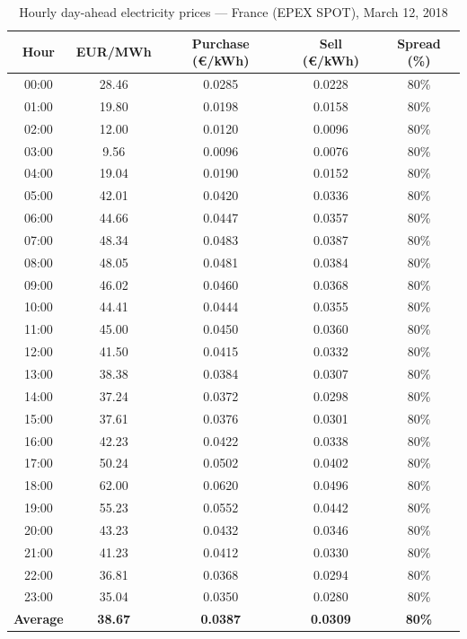 \begin{table}[H]
\centering
\caption{Hourly day-ahead electricity prices --- France (EPEX SPOT), March 12, 2018}
\label{tab:app_prices}
\begin{tabular}{@{}ccccc@{}}
\toprule
\textbf{Hour} & \textbf{EUR/MWh} & \textbf{Purchase (€/kWh)} & \textbf{Sell (€/kWh)} & \textbf{Spread (\%)} \\
\midrule
00:00 & 28.46 & 0.0285 & 0.0228 & 80\% \\
01:00 & 19.80 & 0.0198 & 0.0158 & 80\% \\
02:00 & 12.00 & 0.0120 & 0.0096 & 80\% \\
03:00 &  9.56 & 0.0096 & 0.0076 & 80\% \\
04:00 & 19.04 & 0.0190 & 0.0152 & 80\% \\
05:00 & 42.01 & 0.0420 & 0.0336 & 80\% \\
06:00 & 44.66 & 0.0447 & 0.0357 & 80\% \\
07:00 & 48.34 & 0.0483 & 0.0387 & 80\% \\
08:00 & 48.05 & 0.0481 & 0.0384 & 80\% \\
09:00 & 46.02 & 0.0460 & 0.0368 & 80\% \\
10:00 & 44.41 & 0.0444 & 0.0355 & 80\% \\
11:00 & 45.00 & 0.0450 & 0.0360 & 80\% \\
12:00 & 41.50 & 0.0415 & 0.0332 & 80\% \\
13:00 & 38.38 & 0.0384 & 0.0307 & 80\% \\
14:00 & 37.24 & 0.0372 & 0.0298 & 80\% \\
15:00 & 37.61 & 0.0376 & 0.0301 & 80\% \\
16:00 & 42.23 & 0.0422 & 0.0338 & 80\% \\
17:00 & 50.24 & 0.0502 & 0.0402 & 80\% \\
18:00 & 62.00 & 0.0620 & 0.0496 & 80\% \\
19:00 & 55.23 & 0.0552 & 0.0442 & 80\% \\
20:00 & 43.23 & 0.0432 & 0.0346 & 80\% \\
21:00 & 41.23 & 0.0412 & 0.0330 & 80\% \\
22:00 & 36.81 & 0.0368 & 0.0294 & 80\% \\
23:00 & 35.04 & 0.0350 & 0.0280 & 80\% \\
\midrule
\textbf{Average} & \textbf{38.67} & \textbf{0.0387} & \textbf{0.0309} & \textbf{80\%} \\
\bottomrule
\end{tabular}
\end{table}

